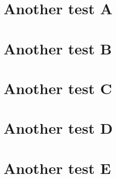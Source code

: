 \chapter{Another test A}
\chapter{Another test B}
\chapter{Another test C}
\chapter{Another test D}
\chapter{Another test E}

